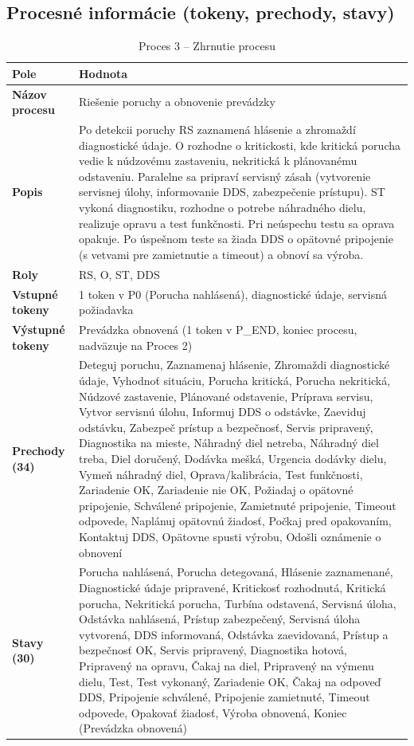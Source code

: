 \documentclass[12pt,a4paper]{article}
\begin{document}
\subsection{Procesné informácie (tokeny, prechody, stavy)}
\begin{table}[H] 
  \centering
  \small
  \renewcommand{\arraystretch}{1.15} 
  \begin{tabularx}{\textwidth}{|p{}|X|}
    \hline
    \textbf{Pole} & \textbf{Hodnota} \\
    \hline
    \textbf{Názov procesu} & Riešenie poruchy a obnovenie prevádzky \\
    \hline
    \textbf{Popis} & Po detekcii poruchy RS zaznamená hlásenie a zhromaždí diagnostické údaje. O rozhodne o kritickosti, kde kritická porucha vedie k núdzovému zastaveniu, nekritická k plánovanému odstaveniu. Paralelne sa pripraví servisný zásah (vytvorenie servisnej úlohy, informovanie DDS, zabezpečenie prístupu). ST vykoná diagnostiku, rozhodne o potrebe náhradného dielu, realizuje opravu a test funkčnosti. Pri neúspechu testu sa oprava opakuje. Po úspešnom teste sa žiada DDS o opätovné pripojenie (s vetvami pre zamietnutie a timeout) a obnoví sa výroba. \\
    \hline
    \textbf{Roly} & RS, O, ST, DDS \\
    \hline
    \textbf{Vstupné tokeny} & 1 token v P0 (Porucha nahlásená), diagnostické údaje, servisná požiadavka \\
    \hline
    \textbf{Výstupné tokeny} & Prevádzka obnovená (1 token v P\_END, koniec procesu, nadväzuje na Proces 2) \\
    \hline
    \textbf{Prechody (34)} & Deteguj poruchu, Zaznamenaj hlásenie, Zhromaždi diagnostické údaje, Vyhodnoť situáciu, Porucha kritická, Porucha nekritická, Núdzové zastavenie, Plánované odstavenie, Príprava servisu, Vytvor servisnú úlohu, Informuj DDS o odstávke, Zaeviduj odstávku, Zabezpeč prístup a bezpečnosť, Servis pripravený, Diagnostika na mieste, Náhradný diel netreba, Náhradný diel treba, Diel doručený, Dodávka mešká, Urgencia dodávky dielu, Vymeň náhradný diel, Oprava/kalibrácia, Test funkčnosti, Zariadenie OK, Zariadenie nie OK, Požiadaj o opätovné pripojenie, Schválené pripojenie, Zamietnuté pripojenie, Timeout odpovede, Naplánuj opätovnú žiadosť, Počkaj pred opakovaním, Kontaktuj DDS, Opätovne spusti výrobu, Odošli oznámenie o obnovení \\
    \hline
    \textbf{Stavy (30)} & Porucha nahlásená, Porucha detegovaná, Hlásenie zaznamenané, Diagnostické údaje pripravené, Kritickosť rozhodnutá, Kritická porucha, Nekritická porucha, Turbína odstavená, Servisná úloha, Odstávka nahlásená, Prístup zabezpečený, Servisná úloha vytvorená, DDS informovaná, Odstávka zaevidovaná, Prístup a bezpečnosť OK, Servis pripravený, Diagnostika hotová, Pripravený na opravu, Čakaj na diel, Pripravený na výmenu dielu, Test, Test vykonaný, Zariadenie OK, Čakaj na odpoveď DDS, Pripojenie schválené, Pripojenie zamietnuté, Timeout odpovede, Opakovať žiadosť, Výroba obnovená, Koniec (Prevádzka obnovená) \\
    \hline
  \end{tabularx}
  \caption{Proces 3 -- Zhrnutie procesu}
\end{table}
\end{document}
